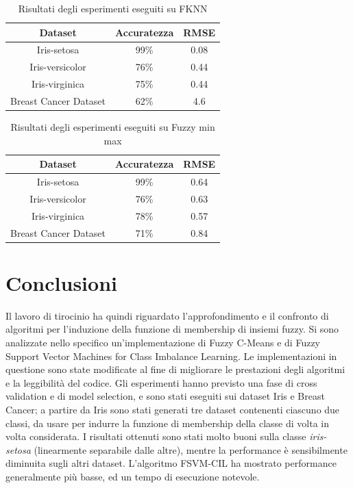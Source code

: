 \documentclass[oneside, openany]{book}
\begin{document}
	\begin{table}[h]
		\caption{Risultati degli esperimenti eseguiti su FKNN}
		\begin{center}\begin{tabular}{ |c|c|c| } 
				\hline
				\textbf{Dataset} & \textbf{Accuratezza} & \textbf{RMSE}\\
				\hline
				Iris-setosa & 99\% & 0.08 \\
				\hline
				Iris-versicolor & 76\% & 0.44 \\
				\hline
				Iris-virginica & 75\% & 0.44 \\
				\hline
				Breast Cancer Dataset & 62\% & 4.6 \\
				\hline                  
			\end{tabular}
		\end{center}
		\label{tab:fknn}  
	\end{table}
	\begin{table}[]
		\caption{Risultati degli esperimenti eseguiti su Fuzzy min max}
		\begin{center}\begin{tabular}{ |c|c|c| } 
				\hline
				\textbf{Dataset} & \textbf{Accuratezza} & \textbf{RMSE}\\
				\hline
				Iris-setosa & 99\% & 0.64 \\
				\hline
				Iris-versicolor & 76\% & 0.63 \\
				\hline
				Iris-virginica & 78\% & 0.57 \\
				\hline
				Breast Cancer Dataset & 71\%  & 0.84 \\
				\hline                  
			\end{tabular}
		\end{center}
		\label{tab:fmm}  
	\end{table}
	\chapter*{Conclusioni}
	Il lavoro di tirocinio ha quindi riguardato l'approfondimento e il confronto di algoritmi per l'induzione della funzione di membership di insiemi fuzzy. Si sono analizzate nello specifico un'implementazione di Fuzzy C-Means e di Fuzzy Support Vector Machines for Class Imbalance Learning. Le implementazioni in questione sono state modificate al fine di migliorare le prestazioni degli algoritmi e la leggibilità del codice. Gli esperimenti hanno previsto una fase di cross validation e di model selection, e sono stati eseguiti sui dataset Iris e Breast Cancer; a partire da Iris sono stati generati tre dataset contenenti ciascuno due classi, da usare per indurre la funzione di membership della classe di volta in volta considerata. I risultati ottenuti sono stati molto buoni sulla classe \textit{iris-setosa} (linearmente separabile dalle altre), mentre la performance è sensibilmente diminuita sugli altri dataset. L'algoritmo FSVM-CIL ha mostrato performance generalmente più basse, ed un tempo di esecuzione notevole.
	
\end{document}
